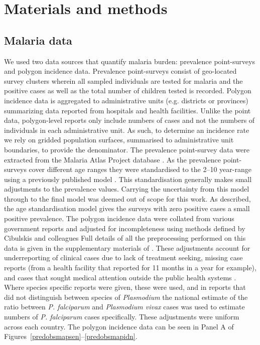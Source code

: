 \documentclass{statsoc}
\begin{document}
\section*{Materials and methods}


\subsection*{Malaria data}

We used two data sources that quantify malaria burden: prevalence point-surveys and polygon incidence data.
Prevalence point-surveys consist of geo-located survey clusters wherein all sampled individuals are tested for malaria and the positive cases as well as the total number of children tested is recorded. 
Polygon incidence data is aggregated to administrative units (e.g. districts or provinces) summarizing data reported from hospitals and health facilities. 
Unlike the point data, polygon-level reports only include numbers of cases and not the numbers of individuals in each administrative unit.  
As such, to determine an incidence rate we rely on gridded population surfaces, summarised to administrative unit boundaries, to provide the denominator. 
The prevalence point-survey data were extracted from the Malaria Atlas Project database \citep{bhatt2015effect, guerra2007assembling, pfeffer2018ma}. 
As the prevalence point-surveys cover different age ranges they were standardised to the 2--10 year-range using a previously published model \citep{smith2007standardizing}. 
This standardisation generally makes small adjustments to the prevalence values.
Carrying the uncertainty from this model through to the final model was deemed out of scope for this work.
As described, the age standardisation model gives the surveys with zero positive cases a small positive prevalence. 
The polygon incidence data were collated from various government reports and adjusted for incompleteness using methods defined by Cibulskis and colleagues \citep{cibulskis2011worldwide}
Full details of all the preprocessing performed on this data is given in the supplementary materials of \cite{weiss2019mapping}. 
These adjustments account for underreporting of clinical cases due to lack of treatment seeking, missing case reports (from a health facility that reported for 11 months in a year for example), and cases that sought medical attention outside the public health systems \citep{battle2016treatment}. 
Where species specific reports were given, these were used, and in reports that did not distinguish between species of \emph{Plasmodium} the national estimate of the ratio between \emph{P. falciparum} and \emph{Plasmodium vivax} cases was used to estimate numbers of \emph{P. falciparum} cases specifically. 
These adjustments were uniform across each country. 
The polygon incidence data can be seen in Panel A of Figures~\ref{predobsmapsen}--\ref{predobsmapidn}.
\end{document}
